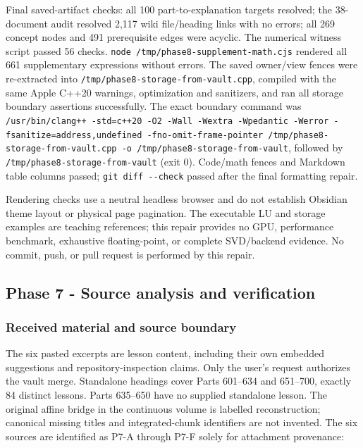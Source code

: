 Final saved-artifact checks: all 100 part-to-explanation targets resolved; the 38-document audit resolved 2,117 wiki file/heading links with no errors; all 269 concept nodes and 491 prerequisite edges were acyclic. The numerical witness script passed 56 checks. \texttt{node\ /tmp/phase8-supplement-math.cjs} rendered all 661 supplementary expressions without errors. The saved owner/view fences were re-extracted into \texttt{/tmp/phase8-storage-from-vault.cpp}, compiled with the same Apple C++20 warnings, optimization and sanitizers, and ran all storage boundary assertions successfully. The exact boundary command was \texttt{/usr/bin/clang++\ -std=c++20\ -O2\ -Wall\ -Wextra\ -Wpedantic\ -Werror\ -fsanitize=address,undefined\ -fno-omit-frame-pointer\ /tmp/phase8-storage-from-vault.cpp\ -o\ /tmp/phase8-storage-from-vault}, followed by \texttt{/tmp/phase8-storage-from-vault} (exit 0). Code/math fences and Markdown table columns passed; \texttt{git\ diff\ -\/-check} passed after the final formatting repair.

Rendering checks use a neutral headless browser and do not establish Obsidian theme layout or physical page pagination. The executable LU and storage examples are teaching references; this repair provides no GPU, performance benchmark, exhaustive floating-point, or complete SVD/backend evidence. No commit, push, or pull request is performed by this repair.

\subsection{Phase 7 - Source analysis and verification}\label{appendix-a103e7846d21-phase-7---source-analysis-and-verification}

\hypertarget{appendix-a103e7846d21-phase-7---source-analysis-and-verification}{}

\subsubsection{Received material and source boundary}\label{appendix-a103e7846d21-received-material-and-source-boundary}

\hypertarget{appendix-a103e7846d21-received-material-and-source-boundary}{}

The six pasted excerpts are lesson content, including their own embedded suggestions and repository-inspection claims. Only the user's request authorizes the vault merge. Standalone headings cover Parts 601--634 and 651--700, exactly 84 distinct lessons. Parts 635--650 have no supplied standalone lesson. The original affine bridge in the continuous volume is labelled reconstruction; canonical missing titles and integrated-chunk identifiers are not invented. The six sources are identified as P7-A through P7-F solely for attachment provenance:

